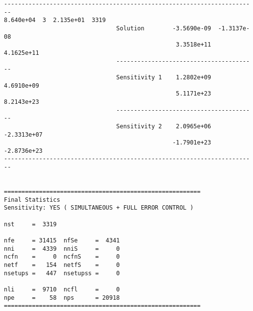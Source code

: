 \begin{verbatim}
------------------------------------------------------------------------
8.640e+04  3  2.135e+01  3319
                                Solution        -3.5690e-09  -1.3137e-08 
                                                 3.3518e+11   4.1625e+11 
                                ----------------------------------------
                                Sensitivity 1    1.2802e+09   4.6910e+09 
                                                 5.1171e+23   8.2143e+23 
                                ----------------------------------------
                                Sensitivity 2    2.0965e+06  -2.3313e+07 
                                                -1.7901e+23  -2.8736e+23 
------------------------------------------------------------------------


========================================================
Final Statistics
Sensitivity: YES ( SIMULTANEOUS + FULL ERROR CONTROL )

nst     =  3319 

nfe     = 31415  nfSe     =  4341 
nni     =  4339  nniS     =     0 
ncfn    =     0  ncfnS    =     0 
netf    =   154  netfS    =     0 
nsetups =   447  nsetupss =     0 

nli     =  9710  ncfl     =     0 
npe     =    58  nps      = 20918 
========================================================
\end{verbatim}